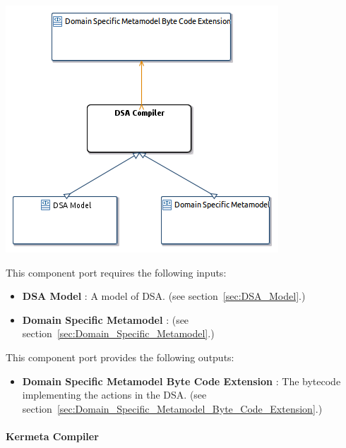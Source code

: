 \documentclass{gemoc} %
\begin{document}
\begin{center}
\includegraphics*[trim=0.0cm 0.0cm 0cm 0.0cm, clip=true]{../images/generated/Generated_DSA_Compiler.png}
\end{center}

This component port requires the following inputs:
\begin{itemize}
  \item \textbf{DSA Model} :
A model of DSA.
(see section~\ref{sec:DSA_Model}.)
  \item \textbf{Domain Specific Metamodel} :
(see section~\ref{sec:Domain_Specific_Metamodel}.)
\end{itemize}

This component port provides the following outputs:
\begin{itemize}
  \item \textbf{Domain Specific Metamodel Byte Code Extension} :
The bytecode implementing the actions in the DSA.
(see section~\ref{sec:Domain_Specific_Metamodel_Byte_Code_Extension}.)
\end{itemize}

\paragraph{Kermeta Compiler}
\label{sec:Kermeta_Compiler}
\end{document}
